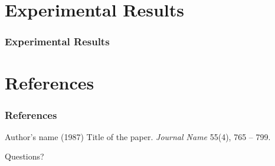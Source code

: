 \documentclass{beamer}
\begin{document}
\section{Experimental Results}
\begin{frame}
\frametitle{Experimental Results}
\end{frame}
\section{References}

\begin{frame}
\frametitle{References}
\footnotesize{
  \begin{thebibliography}{99}
   Author's name (1987)
    \newblock Title of the paper.
    \newblock \emph{Journal Name} 55(4), 765 -- 799.
    \end{thebibliography}
}
\end{frame}

\begin{frame}
\centerline{Questions?}
\end{frame}
\end{document}
